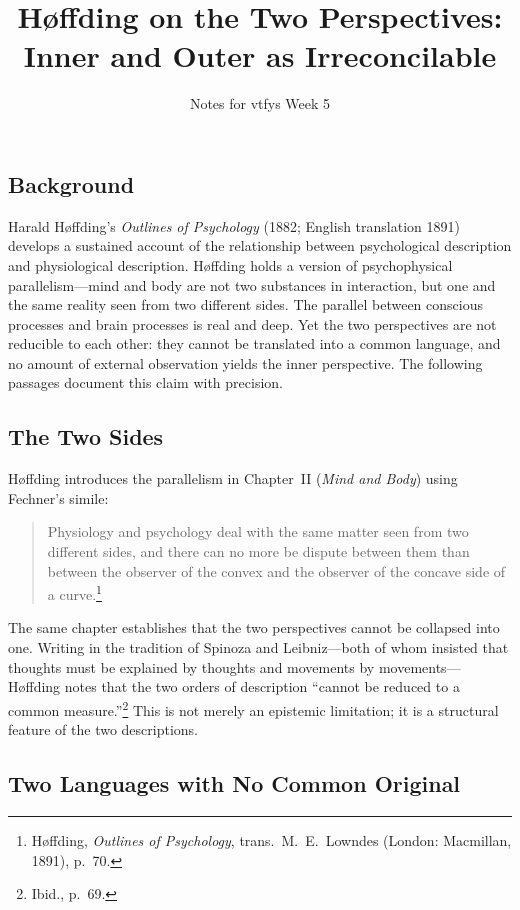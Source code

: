 \documentclass[12pt, a4paper]{article}
\title{\vspace{-1.5em}H{\o}ffding on the Two Perspectives:\\
Inner and Outer as Irreconcilable\vspace{-0.5em}}
\author{Notes for vtfys Week 5}
\date{}
\begin{document}
\maketitle

\subsection*{Background}

Harald H{\o}ffding's \emph{Outlines of Psychology} (1882; English
translation 1891) develops a sustained account of the relationship
between psychological description and physiological description.
H{\o}ffding holds a version of psychophysical parallelism---mind and
body are not two substances in interaction, but one and the same
reality seen from two different sides. The parallel between conscious
processes and brain processes is real and deep. Yet the two
perspectives are not reducible to each other: they cannot be
translated into a common language, and no amount of external
observation yields the inner perspective. The following passages
document this claim with precision.

\subsection*{The Two Sides}

H{\o}ffding introduces the parallelism in Chapter~II (\emph{Mind
and Body}) using Fechner's simile:

\begin{quote}
Physiology and psychology deal with the same matter seen from two
different sides, and there can no more be dispute between them than
between the observer of the convex and the observer of the concave
side of a curve.\footnote{H{\o}ffding, \emph{Outlines of Psychology},
trans.\ M.\ E.\ Lowndes (London: Macmillan, 1891), p.~70.}
\end{quote}

\noindent
The same chapter establishes that the two perspectives cannot be
collapsed into one. Writing in the tradition of Spinoza and
Leibniz---both of whom insisted that thoughts must be explained by
thoughts and movements by movements---H{\o}ffding notes that the two
orders of description ``cannot be reduced to a common
measure.''\footnote{Ibid., p.~69.} This is not merely an epistemic
limitation; it is a structural feature of the two descriptions.

\subsection*{Two Languages with No Common Original}
\end{document}
